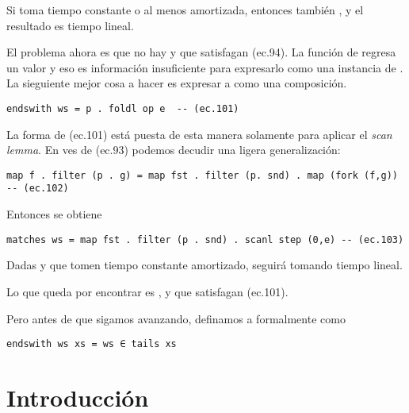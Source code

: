 Si  toma tiempo constante o al menos amortizada, entonces también , y el resultado es tiempo lineal.

El problema ahora es que no hay  y  que satisfagan (ec.94). La función de 
regresa un valor  y eso es información insuficiente para expresarlo como una instancia de
.
La sieguiente mejor cosa a hacer es expresar a  como una composición.

\begin{verbatim}
endswith ws = p . foldl op e  -- (ec.101)
\end{verbatim}

La forma de (ec.101) está puesta de esta manera solamente para aplicar el \textit{scan lemma}. 
En ves de (ec.93) podemos decudir una ligera generalización:
\begin{verbatim}
map f . filter (p . g) = map fst . filter (p. snd) . map (fork (f,g))  -- (ec.102)
\end{verbatim}

Entonces se obtiene
\begin{verbatim}
matches ws = map fst . filter (p . snd) . scanl step (0,e) -- (ec.103)
\end{verbatim} 

Dadas  y  que tomen tiempo constante amortizado,  seguirá tomando tiempo lineal.

Lo que queda por encontrar es ,  y  que satisfagan (ec.101).

Pero antes de que sigamos avanzando, definamos a  formalmente como
\begin{verbatim}
endswith ws xs = ws ∈ tails xs
\end{verbatim}



\section{Introducción}

